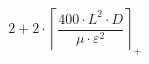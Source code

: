\[2 + 2 \cdot \left\lceil \frac{400 \cdot L^{2} \cdot D}{\mu \cdot \varepsilon^{2}} \right\rceil_{+}\]
